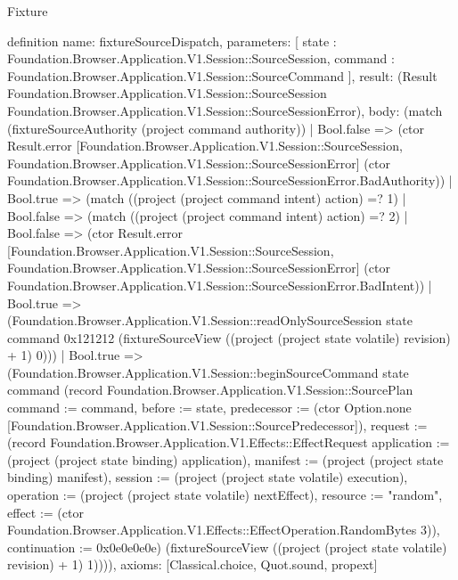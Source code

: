\begin{lexlean}{Fixture}
\begin{semanticmodule}
definition{
  name: fixtureSourceDispatch,
  parameters: [
    state : Foundation.Browser.Application.V1.Session::SourceSession,
    command : Foundation.Browser.Application.V1.Session::SourceCommand
  ],
  result: (Result Foundation.Browser.Application.V1.Session::SourceSession Foundation.Browser.Application.V1.Session::SourceSessionError),
  body: (match (fixtureSourceAuthority (project command authority))
    | Bool.false => (ctor Result.error [Foundation.Browser.Application.V1.Session::SourceSession, Foundation.Browser.Application.V1.Session::SourceSessionError] (ctor Foundation.Browser.Application.V1.Session::SourceSessionError.BadAuthority))
    | Bool.true => (match ((project (project command intent) action) =? 1)
      | Bool.false => (match ((project (project command intent) action) =? 2)
        | Bool.false => (ctor Result.error [Foundation.Browser.Application.V1.Session::SourceSession, Foundation.Browser.Application.V1.Session::SourceSessionError] (ctor Foundation.Browser.Application.V1.Session::SourceSessionError.BadIntent))
        | Bool.true => (Foundation.Browser.Application.V1.Session::readOnlySourceSession state command 0x121212 (fixtureSourceView ((project (project state volatile) revision) + 1) 0)))
      | Bool.true => (Foundation.Browser.Application.V1.Session::beginSourceCommand state command (record Foundation.Browser.Application.V1.Session::SourcePlan {command := command, before := state, predecessor := (ctor Option.none [Foundation.Browser.Application.V1.Session::SourcePredecessor]), request := (record Foundation.Browser.Application.V1.Effects::EffectRequest {application := (project (project state binding) application), manifest := (project (project state binding) manifest), session := (project (project state volatile) execution), operation := (project (project state volatile) nextEffect), resource := "random", effect := (ctor Foundation.Browser.Application.V1.Effects::EffectOperation.RandomBytes 3)}), continuation := 0x0e0e0e0e}) (fixtureSourceView ((project (project state volatile) revision) + 1) 1)))),
  axioms: [Classical.choice, Quot.sound, propext]
}


\end{semanticmodule}
\end{lexlean}
